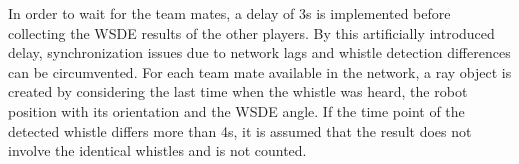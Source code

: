 In order to wait for the team mates,
a delay of 3\si{\second}  is implemented before collecting the \ac{WSDE} results
of the other players.
By this artificially introduced delay, synchronization issues due to network lags and
whistle detection differences can be circumvented.
For each team mate available in the network, a ray object is created by considering the
last time when the whistle was heard, the robot position with its orientation and the \ac{WSDE} angle.
If the time point of the detected whistle differs more than 4\si{\second}, it is assumed that
the result does not involve the identical whistles and is not counted.


